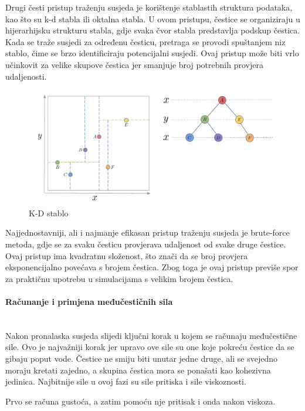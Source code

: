 \documentclass[diplomskirad]{fer}
\newcommand{\paragraphnewline}[1]{\paragraph{#1}\mbox{}\\}
\begin{document}
    Drugi česti pristup traženju susjeda je korištenje stablastih struktura podataka, kao što su k-d stabla ili oktalna stabla.
    U ovom pristupu, čestice se organiziraju u hijerarhijsku strukturu stabla, gdje svaka čvor stabla predstavlja podskup čestica.
    Kada se traže susjedi za određenu česticu, pretraga se provodi spuštanjem niz stablo, čime se brzo identificiraju potencijalni susjedi.
    Ovaj pristup može biti vrlo učinkovit za velike skupove čestica jer smanjuje broj potrebnih provjera udaljenosti.

    \begin{figure}[H]
        \centering
        \includegraphics[scale=0.3]{images/kdtree}
        \caption{
            K-D stablo \cite{kdTree}
        }
        \label{fig:kdTree}
    \end{figure}

    Najjednostavniji, ali i najmanje efikasan pristup traženju susjeda je brute-force metoda, gdje se za svaku česticu provjerava udaljenost od svake druge čestice.
    Ovaj pristup ima kvadratnu složenost, što znači da se broj provjera eksponencijalno povećava s brojem čestica.
    Zbog toga je ovaj pristup previše spor za praktičnu upotrebu u simulacijama s velikim brojem čestica.


    \paragraphnewline{Računanje i primjena međučestičnih sila}

    Nakon pronalaska susjeda slijedi ključni korak u kojem se računaju međučestične sile.
    Ovo je najvažniji korak jer upravo ove sile su one koje pokreću čestice da se gibaju poput vode.
    Čestice ne smiju biti unutar jedne druge, ali se svejedno moraju kretati zajedno, a skupina čestica mora se ponašati kao kohezivna jedinica.
    Najbitnije sile u ovoj fazi su sile pritiska i sile viskoznosti.

    Prvo se računa gustoća, a zatim pomoću nje pritisak i onda nakon viskoza.
\end{document}
